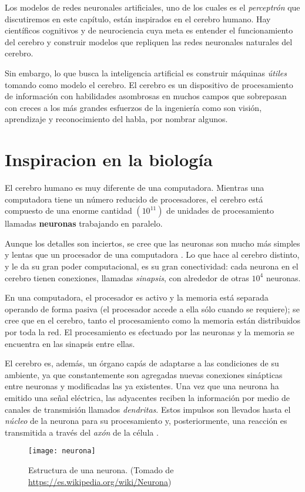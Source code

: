Los modelos de redes neuronales artificiales, uno de los cuales es el
\textit{perceptrón} que discutiremos en este capítulo, están
inspirados en el cerebro humano. Hay científicos cognitivos y de
neurociencia cuya meta es entender el funcionamiento del cerebro y
construir modelos que repliquen las redes neuronales naturales del
cerebro.

Sin embargo, lo que busca la inteligencia artificial es construir
máquinas \textit{útiles} tomando como modelo el cerebro. El cerebro es
un dispositivo de procesamiento de información con habilidades
asombrosas en muchos campos que sobrepasan con creces a los más
grandes esfuerzos de la ingeniería como son visión, aprendizaje y
reconocimiento del habla, por nombrar algunos.

\section{Inspiracion en la biología}
El cerebro humano es muy diferente de una computadora. Mientras una
computadora tiene un número reducido de procesadores, el cerebro está
compuesto de una enorme cantidad $(10^{11})$ de unidades de
procesamiento llamadas \textbf{neuronas} trabajando en paralelo.

Aunque los detalles son inciertos, se cree que las neuronas son mucho
más simples y lentas que un procesador de una computadora
\cite{ethem}. Lo que hace al cerebro distinto, y le da su gran poder
computacional, es su gran conectividad: cada neurona en el cerebro
tienen conexiones, llamadas \textit{sinapsis}, con alrededor de otras
$10^{4}$ neuronas.

En una computadora, el procesador es activo y la memoria está separada
operando de forma pasiva (el procesador accede a ella sólo cuando se
requiere); se cree que en el cerebro, tanto el procesamiento como la
memoria están distribuidos por toda la red. El procesamiento es
efectuado por las neuronas y la memoria se encuentra en las sinapsis
entre ellas.

El cerebro es, además, un órgano capás de adaptarse a las condiciones
de su ambiente, ya que constantemente son agregadas nuevas conexiones
sinápticas entre neuronas y modificadas las ya existentes. Una vez que
una neurona ha emitido una señal eléctrica, las adyacentes reciben la
información por medio de canales de transmisión llamados
\textit{dendritas}. Estos impulsos son llevados hasta el
\textit{núcleo} de la neurona para su procesamiento y, posteriormente,
una reacción es transmitida a través del \textit{axón} de la célula
\cite{memes}.
\begin{figure}[h]
  \texttt{[image: neurona]} \centering
  \caption{Estructura de una neurona. (Tomado de
    \url{https://es.wikipedia.org/wiki/Neurona})}
\end{figure}

